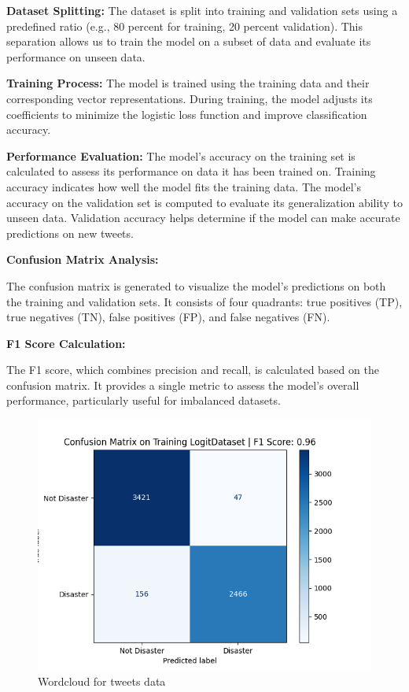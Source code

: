 \textbf{Dataset Splitting:}
The dataset is split into training and validation sets using a predefined ratio (e.g., 80 percent for training, 20 percent validation).
This separation allows us to train the model on a subset of data and evaluate its performance on unseen data.

\textbf{Training Process:}
The model is trained using the training data and their corresponding vector representations. During training, the model adjusts its coefficients to minimize the logistic loss function and improve classification accuracy.

\textbf{Performance Evaluation:}
The model's accuracy on the training set is calculated to assess its performance on data it has been trained on. Training accuracy indicates how well the model fits the training data. The model's accuracy on the validation set is computed to evaluate its generalization ability to unseen data.
Validation accuracy helps determine if the model can make accurate predictions on new tweets.

\newpage
\textbf{Confusion Matrix Analysis:}

The confusion matrix is generated to visualize the model's predictions on both the training and validation sets.
It consists of four quadrants: true positives (TP), true negatives (TN), false positives (FP), and false negatives (FN).

\textbf{F1 Score Calculation:}

The F1 score, which combines precision and recall, is calculated based on the confusion matrix.
It provides a single metric to assess the model's overall performance, particularly useful for imbalanced datasets.


\begin{figure}[ht]
    \centering
    \includegraphics[scale=0.7]{figures/LogisticRegression_Training Logit_confusion_matrix.png}
    \caption{Wordcloud for tweets data}
\end{figure}

